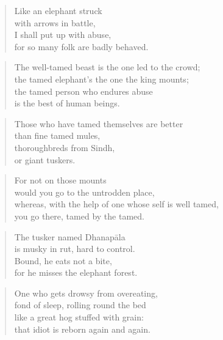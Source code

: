 \documentclass[12pt,openany]{book}%
\begin{document}
\begin{verse}%
Like an elephant struck \\
with arrows in battle, \\
I shall put up with abuse, \\
for so many folk are badly behaved. 

%
\end{verse}

\begin{verse}%
The well-tamed beast is the one led to the crowd; \\
the tamed elephant’s the one the king mounts; \\
the tamed person who endures abuse \\
is the best of human beings. 

%
\end{verse}

\begin{verse}%
Those who have tamed themselves are better \\
than fine tamed mules, \\
thoroughbreds from Sindh, \\
or giant tuskers. 

%
\end{verse}

\begin{verse}%
For not on those mounts \\
would you go to the untrodden place, \\
whereas, with the help of one whose self is well tamed, \\
you go there, tamed by the tamed. 

%
\end{verse}

\begin{verse}%
The tusker named \textsanskrit{Dhanapāla} \\
is musky in rut, hard to control. \\
Bound, he eats not a bite, \\
for he misses the elephant forest. 

%
\end{verse}

\begin{verse}%
One who gets drowsy from overeating, \\
fond of sleep, rolling round the bed \\
like a great hog stuffed with grain: \\
that idiot is reborn again and again. 

%
\end{verse}
\end{document}
